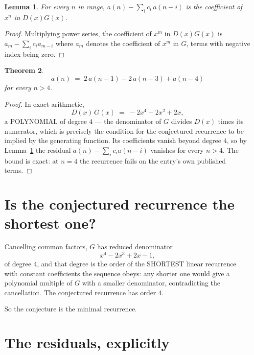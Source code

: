 \documentclass[11pt,a4paper]{article}
\theoremstyle{plain}
\newtheorem{theorem}{Theorem}
\newtheorem{lemma}[theorem]{Lemma}
\theoremstyle{definition}
\begin{document}
\begin{lemma}\label{lem:key}
For every $n$ in range, $a(n)-\sum_i c_i\,a(n-i)$ is the coefficient of $x^{n}$ in
$D(x)G(x)$.
\end{lemma}

\begin{proof}
Multiplying power series, the coefficient of $x^{m}$ in $D(x)G(x)$ is
$a_m-\sum_i c_i a_{m-i}$ where $a_m$ denotes the coefficient of $x^{m}$ in $G$, terms with
negative index being zero.
\end{proof}

\begin{theorem}
\[
a(n)\;=\;2\,a(n-1) - 2\,a(n-3) + a(n-4)
\]
for every $n>4$.
\end{theorem}

\begin{proof}
In exact arithmetic,
\[
D(x)\,G(x)\;=\;- 2 x^{4} + 2 x^{2} + 2 x,
\]
a POLYNOMIAL of degree $4$ --- the denominator of $G$ divides $D(x)$ times its numerator,
which is precisely the condition for the conjectured recurrence to be implied by the
generating function. Its coefficients vanish beyond degree $4$, so by
Lemma~\ref{lem:key} the residual $a(n)-\sum_ic_ia(n-i)$ vanishes for every
$n>4$. The bound is exact: at $n=4$ the recurrence fails on the entry's own published terms.
\end{proof}

\section{Is the conjectured recurrence the shortest one?}

Cancelling common factors, $G$ has reduced denominator
\[
x^{4} - 2 x^{3} + 2 x - 1,
\]
of degree $4$, and that degree is the order of the SHORTEST linear recurrence with
constant coefficients the sequence obeys: any shorter one would give a polynomial multiple of
$G$ with a smaller denominator, contradicting the cancellation. The conjectured recurrence has
order $4$.

So the conjecture is the minimal recurrence.

\section{The residuals, explicitly}
\end{document}
